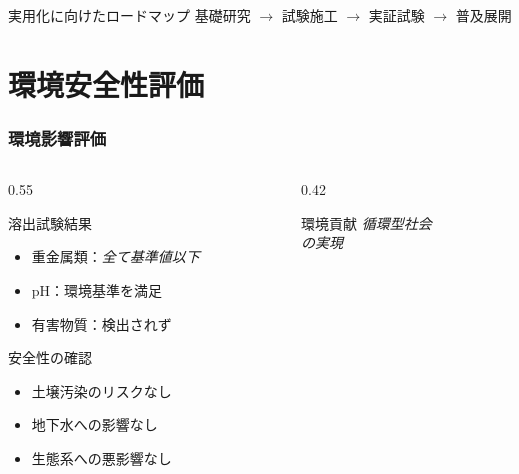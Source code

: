 \documentclass[unicode, 9pt, aspectratio=43]{beamer}
\begin{document}
\begin{refsection}
\begin{frame}
    \vspace{1em}

    \begin{center}
      \begin{minipage}{0.7\linewidth}
        \begin{block}{実用化に向けたロードマップ}
          \centering
          \small
          基礎研究 \(\to \) 試験施工 \(\to \) 実証試験 \(\to \) 普及展開
        \end{block}
      \end{minipage}
    \end{center}
  \end{frame}

  \section{環境安全性評価}

  \begin{frame}
    \frametitle{環境影響評価}
    \begin{columns}
      \begin{column}{0.55\linewidth}
        \begin{block}{溶出試験結果}
          \begin{itemize}
            \item 重金属類：\emph{全て基準値以下}
            \item pH：環境基準を満足
            \item 有害物質：検出されず
          \end{itemize}
        \end{block}

        \vspace{1em}

        \begin{alertblock}{安全性の確認}
          \begin{itemize}
            \item 土壌汚染のリスクなし
            \item 地下水への影響なし
            \item 生態系への悪影響なし
          \end{itemize}
        \end{alertblock}
      \end{column}

      \begin{column}{0.42\linewidth}
        \begin{exampleblock}{環境貢献}
          \centering
          \Large
          \emph{循環型社会}\\
          \emph{の実現}


\end{exampleblock}
\end{column}
\end{columns}
\end{frame}
\end{refsection}
\end{document}
